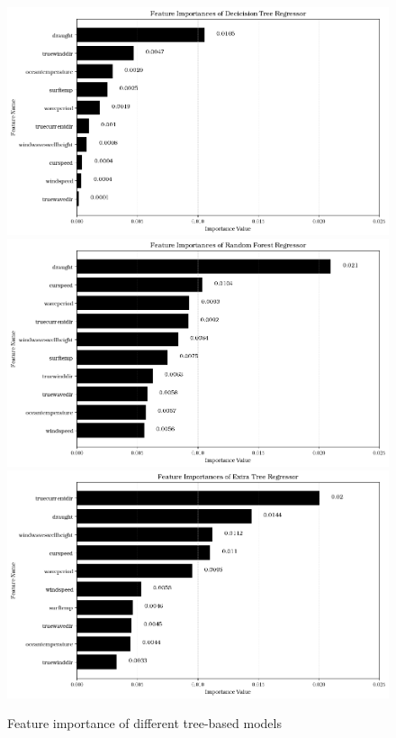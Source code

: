\begin{figure}
    \centering
    \includegraphics[width=.82\textwidth]{02_figures/dtr_ftr_importance_nodir.png}\\
    \includegraphics[width=.82\textwidth]{02_figures/rfr_ftr_importance_nodir.png}\\
    \includegraphics[width=.82\textwidth]{02_figures/etr_ftr_importance_nodir.png}
    \caption{Feature importance of different tree-based models}
    \label{fig:ftr_impo_overall_tree}
\end{figure}


